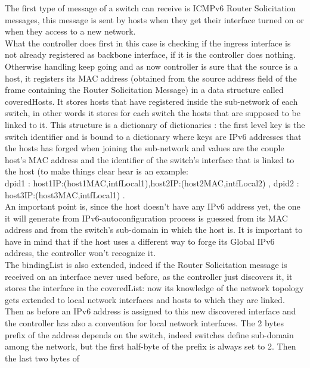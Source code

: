 \documentclass{article}
\begin{document}
The first type of message of a switch can receive is ICMPv6 Router
Solicitation messages, this message is sent by hosts when they get their
interface turned on or when they access to a new network.\\ 
\newline
What the controller does first in this case is checking if the ingress
interface is not already registered as backbone interface, if it is
the controller does nothing. Otherwise handling keep going and as now
controller is sure that the source is a host, it registers its MAC
address (obtained from the source address field of the frame
containing the Router Solicitation Message) in a data structure called
coveredHosts. It stores hosts that have registered inside the
sub-network of each switch, in other words it stores for each switch
the hosts that are supposed to be linked to it. This structure is a
dictionary of dictionaries : the first level key is the switch
identifier and is bound to a dictionary where keys are IPv6 addresses
that the hosts has forged when joining the sub-network and values are
the couple host's MAC address and the identifier of the switch's interface
that is linked to the host (to make things clear hear is an example:\\
{dpid1 : {host1IP:(host1MAC,intfLocal1),host2IP:(host2MAC,intfLocal2)}
, dpid2 : {host3IP:(host3MAC,intfLocal1)} }. \\
\newline
An important point is, since the host doesn't have any IPv6 address
yet, the one it will generate from IPv6-autoconfiguration process is
guessed from its MAC address and from the switch's sub-domain in which
the host is. It is important to have in mind that if the host uses a
different way to forge its Global IPv6 address, the controller won't
recognize it.\\
\newline
The bindingList is also extended, indeed if the Router Solicitation
message is received on an interface never used before, as the
controller just discovers it, it stores the interface in the
coveredList: now its knowledge of the network topology gets extended
to local network interfaces and hosts to which they are linked. Then
as before an IPv6 address is assigned to this new discovered interface
and the controller has also a convention for local network
interfaces. The 2 bytes prefix of the address depends on the switch,
indeed switches define sub-domain among the network, but the first
half-byte of the prefix is always set to 2. Then the last two bytes of
\end{document}

